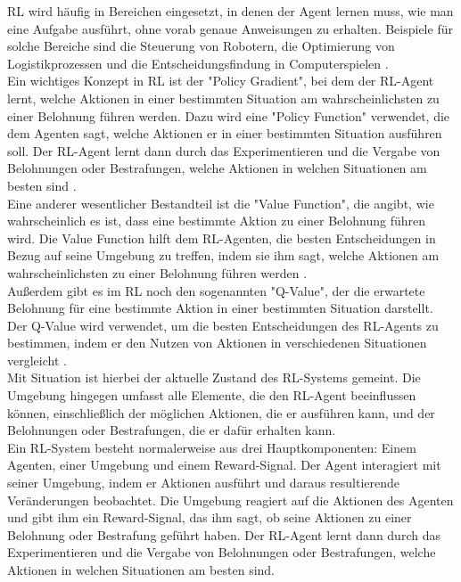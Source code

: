 \documentclass[oneside,bibliography=totocnumbered,BCOR=5mm]{scrbook}%
\theoremstyle{definition}
\theoremstyle{definition}
\theoremstyle{definition}
\theoremstyle{definition}
\theoremstyle{definition}
\theoremstyle{definition}
\begin{document}
RL wird häufig in Bereichen eingesetzt, in denen der Agent lernen muss, wie man eine Aufgabe ausführt, 
ohne vorab genaue Anweisungen zu erhalten. Beispiele für solche Bereiche sind die Steuerung von Robotern, 
die Optimierung von Logistikprozessen und die Entscheidungsfindung in Computerspielen \autocite[Seite 1]{deepRL}. \\


Ein wichtiges Konzept in RL ist der "Policy Gradient", bei dem der RL-Agent lernt, 
welche Aktionen in einer bestimmten Situation am wahrscheinlichsten zu einer Belohnung führen werden. 
Dazu wird eine "Policy Function" verwendet, die dem Agenten sagt, welche Aktionen er in einer bestimmten Situation ausführen soll. 
Der RL-Agent lernt dann durch das Experimentieren und die Vergabe von Belohnungen oder Bestrafungen, 
welche Aktionen in welchen Situationen am besten sind \autocite[Seite 5]{deepRL}. \\


Eine anderer wesentlicher Bestandteil ist die "Value Function", 
die angibt, wie wahrscheinlich es ist, dass eine bestimmte Aktion zu einer Belohnung führen wird. 
Die Value Function hilft dem RL-Agenten, die besten Entscheidungen in Bezug auf seine Umgebung zu treffen, 
indem sie ihm sagt, welche Aktionen am wahrscheinlichsten zu einer Belohnung führen werden \autocite[Seite 6]{deepRL}. \\


Außerdem gibt es im RL noch den sogenannten "Q-Value", der die erwartete Belohnung für eine 
bestimmte Aktion in einer bestimmten Situation darstellt. 
Der Q-Value wird verwendet, um die besten Entscheidungen des RL-Agents zu bestimmen, 
indem er den Nutzen von Aktionen in verschiedenen Situationen vergleicht \autocite[Seite 4]{deepRL}. \\


Mit Situation ist hierbei der aktuelle Zustand des RL-Systems gemeint. 
Die Umgebung hingegen umfasst alle Elemente, die den RL-Agent beeinflussen können, 
einschließlich der möglichen Aktionen, die er ausführen kann, und der Belohnungen oder Bestrafungen, 
die er dafür erhalten kann. \\


Ein RL-System besteht normalerweise aus drei Hauptkomponenten: 
Einem Agenten, einer Umgebung und einem Reward-Signal. Der Agent interagiert mit seiner Umgebung, 
indem er Aktionen ausführt und daraus resultierende Veränderungen beobachtet. 
Die Umgebung reagiert auf die Aktionen des Agenten und gibt ihm ein Reward-Signal, 
das ihm sagt, ob seine Aktionen zu einer Belohnung oder Bestrafung geführt haben. 
Der RL-Agent lernt dann durch das Experimentieren und die Vergabe von Belohnungen oder Bestrafungen, 
welche Aktionen in welchen Situationen am besten sind. \\
\end{document}
